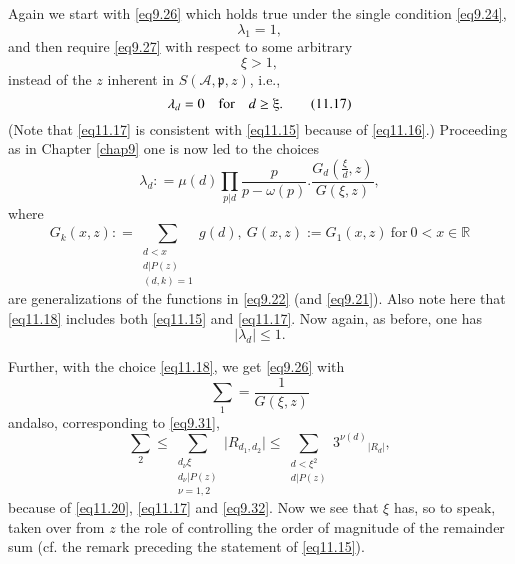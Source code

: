 Again we start with \eqref{eq9.26} which holds true under the single
condition \eqref{eq9.24}, 
\begin{equation*}
\lambda_1  =  1,\tag{11.15}\label{eq11.15}
\end{equation*} 
and then require \eqref{eq9.27} with respect to some arbitrary 
\begin{equation*}
\xi >1,\tag{11.16}\label{eq11.16}
\end{equation*} 
instead of the $z$ inherent in $S (\mathscr{A}, \mathfrak{p},z)$, i.e., 
\begin{equation*}
\lambda_d = 0  \quad\text{for}\quad  d \ge \xiup. 
\tag{11.17}\label{eq11.17} 
\end{equation*}
(Note that \eqref{eq11.17} is consistent with \eqref{eq11.15} because
of \eqref{eq11.16}.) Proceeding as in Chapter \ref{chap9} one is now
led to the choices  
\begin{equation*}
\lambda_d : = \mu (d) \prod_{p|d} \frac{p} {p-\omega(p)} . \frac{G_d
  (\frac{\xi} {d}, z)} {G (\xi,z)},\tag{11.18}\label{eq11.18} 
\end{equation*} 
where
\begin{equation*}
G_k (x,z) : = \sum_{\substack{d < x\\ d|P(z)\\ (d,k) = 1}} g(d), ~ G
(x,z):= G_1(x,z) ~\text{for} ~ 0 < x \in
\mathbb{R}\tag{11.19}\label{eq11.19}  
\end{equation*} 
are generalizations of the functions in \eqref{eq9.22}
(and \eqref{eq9.21}). Also note here that \eqref{eq11.18} includes both
\eqref{eq11.15} and \eqref{eq11.17}. Now again, as before, one has   
\begin{equation*}
|\lambda_d | \le 1.\tag{11.20}\label{eq11.20}
\end{equation*}

Further, with the choice \eqref{eq11.18}, we get \eqref{eq9.26} with 
\begin{equation*}
\sum_1 = \frac{1} {G (\xi,z)} \tag{11.21}\label{eq11.21}
\end{equation*} 
and\pageoriginale also, corresponding to \eqref{eq9.31},
\begin{equation*}
\sum_2 \le \sum_{\substack{d_\nu \xi \\ d_\nu|P(z) \\ \nu = 1,2}}
\big| R_{d_1, d_2} \big| \le \sum_{\substack{d < \xi{^2} \\ d| P(z)}}
3 ^{\nu(d)}{_{|R_d|}},\tag{11.22}\label{eq11.22} 
\end{equation*} 
because of \eqref{eq11.20}, \eqref{eq11.17} and \eqref{eq9.32}. Now we
see that $\xi$ 
has, so to speak, taken over from $z$ the role of controlling the
order of magnitude of the remainder sum (cf. the remark preceding the
statement of \eqref{eq11.15}). 

